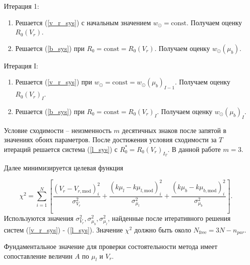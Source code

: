 \documentclass{matmex-diploma-custom}
\begin{document}
Итерация 1:
\begin{enumerate}
        \item Решается (\ref{v_r_sys}) с начальным значением $w_{\odot} = \mathrm{const}$. Получаем оценку $R_0(V_r)$.

        \item Решается (\ref{b_sys}) при $R_0 = \mathrm{const} = R_0(V_r)$. Получаем оценку $w_{\odot}(\mu_b)$.
\end{enumerate}
Итерация I:
\begin{enumerate}
\item Решается (\ref{v_r_sys}) при $w_{\odot} = \mathrm{const} = w_{\odot}(\mu_b)_{I - 1}$. Получаем оценку $R_0(V_r)_I$.
\item Решается (\ref{b_sys}) при $R_0 = \mathrm{const} = R_0(V_r)_I$. Получаем оценку $w_{\odot}(\mu_b)_I$.
\end{enumerate}
Условие сходимости -- неизменность $m$ десятичных знаков после запятой в значениях обоих параметров. После достижения условия сходимости за $T$ итераций решается система (\ref{l_sys}) с $R_0^{*}=R_0(V_r)_{I_T}$. В данной работе $m=3$.

Далее минимизируется целевая функция

\begin{equation} \label{chi_sq_func}
                \chi^2 = \sum^N_{i = 1} \left[ \frac{\left( V_r - V_{r, \mathrm{mod}} \right)^2_i}{\sigma^2_{V_r}} + \frac{\left(k \mu_l - k \mu_{l, \mathrm{mod}} \right)^2_i}{\sigma^2_{\mu_l}} + \frac{\left(k \mu_b - k\mu_{b, \mathrm{mod}} \right)^2_i}{\sigma^2_{\mu_b}} \right].
	\end{equation}
Используются значения $\sigma^2_{V_r}, \sigma^2_{\mu_b}, \sigma^2_{\mu_l}$, найденные после итеративного решения систем (\ref{v_r_sys}) - (\ref{l_sys}). Значение $\chi^2$ должно быть около $N_{\mathrm{free}} = 3 N - n_{par}$. 

Фундаментальное значение для проверки состоятельности метода имеет сопоставление величин $A$ по $\mu_l$ и $V_r$.
\end{document}
